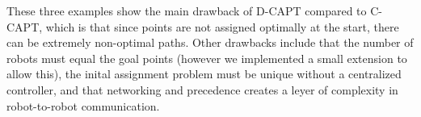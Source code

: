 These three examples show the main drawback of D-CAPT compared to C-CAPT, which is that since points are not assigned optimally at the start, there can be extremely non-optimal paths. Other drawbacks include that the number of robots must equal the goal points (however we implemented a small extension to allow this), the inital assignment problem must be unique without a centralized controller, and that networking and precedence creates a leyer of complexity in robot-to-robot communication.